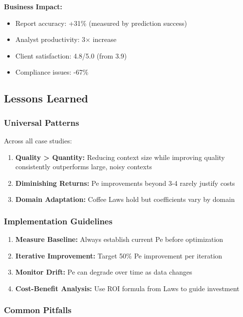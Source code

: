 \documentclass[conference]{IEEEtran}
\begin{document}
\textbf{Business Impact:}
\begin{itemize}
\item Report accuracy: +31\% (measured by prediction success)
\item Analyst productivity: 3× increase
\item Client satisfaction: 4.8/5.0 (from 3.9)
\item Compliance issues: -67\%
\end{itemize}

\subsection{Lessons Learned}

\subsubsection{Universal Patterns}

Across all case studies:
\begin{enumerate}
\item \textbf{Quality > Quantity:} Reducing context size while improving quality consistently outperforms large, noisy contexts
\item \textbf{Diminishing Returns:} Pe improvements beyond 3-4 rarely justify costs
\item \textbf{Domain Adaptation:} Coffee Laws hold but coefficients vary by domain
\end{enumerate}

\subsubsection{Implementation Guidelines}

\begin{enumerate}
\item \textbf{Measure Baseline:} Always establish current Pe before optimization
\item \textbf{Iterative Improvement:} Target 50\% Pe improvement per iteration
\item \textbf{Monitor Drift:} Pe can degrade over time as data changes
\item \textbf{Cost-Benefit Analysis:} Use ROI formula from Laws to guide investment
\end{enumerate}

\subsubsection{Common Pitfalls}
\end{document}
